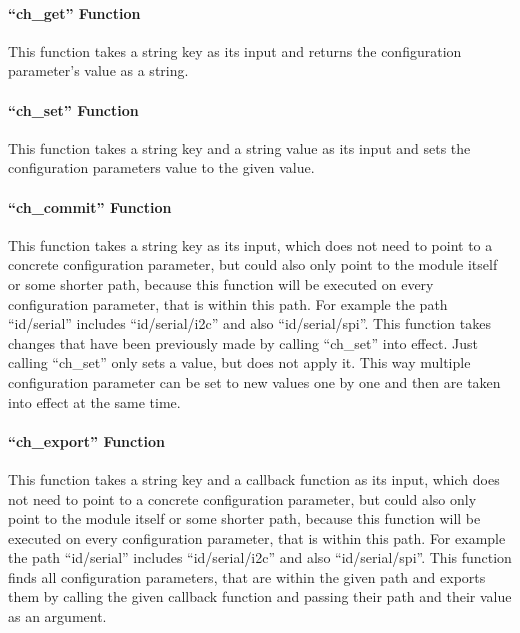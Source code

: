 \paragraph*{``ch\_get'' Function}\mbox{}

This function takes a string key as its input and returns the configuration parameter's value as a string.

\paragraph*{``ch\_set'' Function}\mbox{}

This function takes a string key and a string value as its input and sets the configuration parameters value to the given value.

\paragraph*{``ch\_commit'' Function}\mbox{}

This function takes a string key as its input, which does not need to point to a concrete configuration parameter, but could also only point to the module itself or some shorter path, because this function will be executed on every configuration parameter, that is within this path.
For example the path ``id/serial'' includes ``id/serial/i2c'' and also ``id/serial/spi''.
This function takes changes that have been previously made by calling ``ch\_set'' into effect.
Just calling ``ch\_set'' only sets a value, but does not apply it.
This way multiple configuration parameter can be set to new values one by one and then are taken into effect at the same time.

\paragraph*{``ch\_export'' Function}\mbox{}

This function takes a string key and a callback function as its input, which does not need to point to a concrete configuration parameter, but could also only point to the module itself or some shorter path, because this function will be executed on every configuration parameter, that is within this path.
For example the path ``id/serial'' includes ``id/serial/i2c'' and also ``id/serial/spi''.
This function finds all configuration parameters, that are within the given path and exports them by calling the given callback function and passing their path and their value as an argument.

